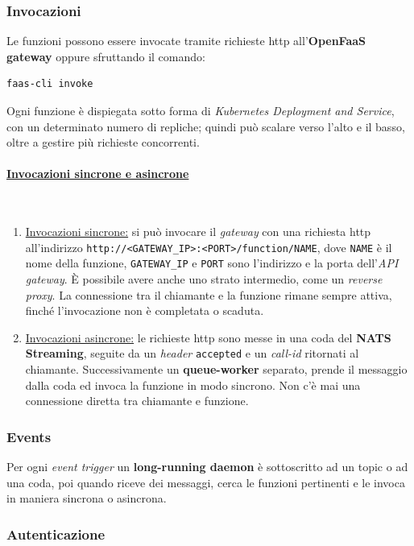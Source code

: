 \documentclass[12pt,a4paper,openany,twoside]{book}
\begin{document}
\subsubsection{Invocazioni}

Le funzioni possono essere invocate tramite richieste \ac{http} all'\textbf{OpenFaaS gateway} oppure sfruttando il comando:\begin{lstlisting}
faas-cli invoke\end{lstlisting}
\noindent
Ogni funzione è dispiegata sotto forma di \textit{Kubernetes Deployment and Service}, con un determinato numero di repliche; quindi può scalare verso l'alto e il basso, oltre a gestire più richieste concorrenti.

\paragraph{\underline{Invocazioni sincrone e asincrone}} ~\\
\begin{enumerate}
    \item \underline{Invocazioni sincrone:} si può invocare il \textit{gateway} con una richiesta \ac{http} all'indirizzo \texttt{http://<GATEWAY\_IP>:<PORT>/function/NAME}, dove \texttt{NAME} è il nome della funzione, \texttt{GATEWAY\_IP} e \texttt{PORT} sono l'indirizzo e la porta dell'\textit{API gateway}. È possibile avere anche uno strato intermedio, come un \textit{reverse proxy}. La connessione tra il chiamante e la funzione rimane sempre attiva, finché l'invocazione non è completata o scaduta.
    \item \underline{Invocazioni asincrone:} le richieste \ac{http} sono messe in una coda del \textbf{NATS Streaming}, seguite da un \textit{header} \texttt{accepted} e un \textit{call-id} ritornati al chiamante. Successivamente un \textbf{queue-worker} separato, prende il messaggio dalla coda ed invoca la funzione in modo sincrono. Non c'è mai una connessione diretta tra chiamante e funzione.
\end{enumerate}

\subsubsection{Events}
Per ogni \textit{event trigger} un \textbf{long-running daemon} è sottoscritto ad un topic o ad una coda, poi quando riceve dei messaggi, cerca le funzioni pertinenti e le invoca in maniera sincrona o asincrona.

\subsubsection{Autenticazione}
\end{document}
